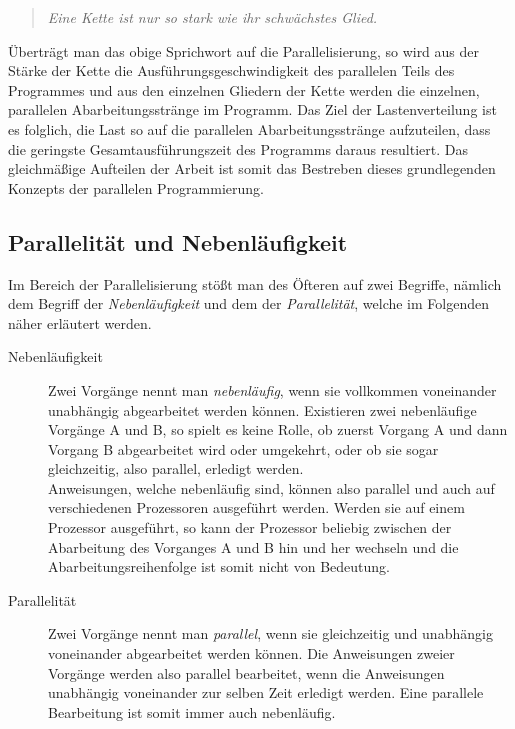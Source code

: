 				\begin{quote}
					 \textit{Eine Kette ist nur so stark wie ihr schwächstes Glied. \cite{SprichwortKette}}
				\end{quote}
				
			Überträgt man das obige Sprichwort auf die Parallelisierung, so wird aus der Stärke der Kette die Ausführungsgeschwindigkeit des parallelen Teils des Programmes und aus den einzelnen Gliedern der Kette werden die einzelnen, parallelen Abarbeitungsstränge im Programm.
			Das Ziel der Lastenverteilung ist es folglich, die Last so auf die parallelen Abarbeitungsstränge aufzuteilen, dass die geringste Gesamtausführungszeit des Programms daraus resultiert. Das gleichmäßige Aufteilen der Arbeit ist somit das Bestreben dieses grundlegenden Konzepts der parallelen Programmierung.			
			
		\subsection{Parallelität und Nebenläufigkeit}
			
			Im Bereich der Parallelisierung stößt man des Öfteren auf zwei Begriffe, nämlich dem Begriff der \textit{Nebenläufigkeit} und dem der \textit{Parallelität}, welche im Folgenden näher erläutert werden.	
			
			\begin{description}
				\item[Nebenläufigkeit]
				  Zwei Vorgänge nennt man \textit{nebenläufig}, wenn sie vollkommen voneinander unabhängig abgearbeitet werden können. Existieren zwei nebenläufige Vorgänge A und B, so spielt es keine Rolle, ob zuerst Vorgang A und dann Vorgang B abgearbeitet wird oder umgekehrt, oder ob sie sogar gleichzeitig, also parallel, erledigt werden.\\
				  Anweisungen, welche nebenläufig sind, können also parallel und auch auf verschiedenen Prozessoren ausgeführt werden. Werden sie auf einem Prozessor ausgeführt, so kann der Prozessor beliebig zwischen der Abarbeitung des Vorganges A und B hin und her wechseln und die Abarbeitungsreihenfolge ist somit nicht von Bedeutung.
			  \item[Parallelität]
				  Zwei Vorgänge nennt man \textit{parallel}, wenn sie gleichzeitig und unabhängig voneinander abgearbeitet werden können. Die Anweisungen zweier Vorgänge werden also parallel bearbeitet, wenn die Anweisungen unabhängig voneinander zur selben Zeit erledigt werden. Eine parallele Bearbeitung ist somit immer auch nebenläufig.
			\end{description}
			
